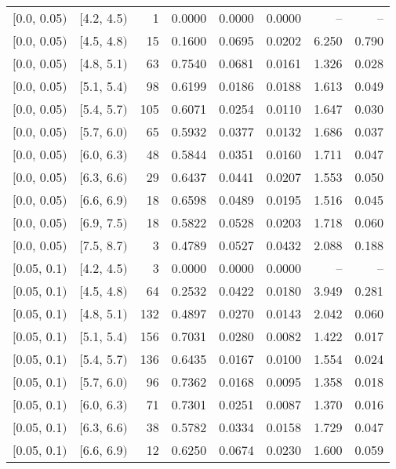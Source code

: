 \begin{longtable}{| l | l | r | r | r | r | r | r |}
        $[$0.0, 0.05$)$ & $[$4.2, 4.5$)$ & 1 & 0.0000 & 0.0000 & 0.0000 & -- & -- \\
        $[$0.0, 0.05$)$ & $[$4.5, 4.8$)$ & 15 & 0.1600 & 0.0695 & 0.0202 & 6.250 & 0.790 \\
        $[$0.0, 0.05$)$ & $[$4.8, 5.1$)$ & 63 & 0.7540 & 0.0681 & 0.0161 & 1.326 & 0.028 \\
        $[$0.0, 0.05$)$ & $[$5.1, 5.4$)$ & 98 & 0.6199 & 0.0186 & 0.0188 & 1.613 & 0.049 \\
        $[$0.0, 0.05$)$ & $[$5.4, 5.7$)$ & 105 & 0.6071 & 0.0254 & 0.0110 & 1.647 & 0.030 \\
        $[$0.0, 0.05$)$ & $[$5.7, 6.0$)$ & 65 & 0.5932 & 0.0377 & 0.0132 & 1.686 & 0.037 \\
        $[$0.0, 0.05$)$ & $[$6.0, 6.3$)$ & 48 & 0.5844 & 0.0351 & 0.0160 & 1.711 & 0.047 \\
        $[$0.0, 0.05$)$ & $[$6.3, 6.6$)$ & 29 & 0.6437 & 0.0441 & 0.0207 & 1.553 & 0.050 \\
        $[$0.0, 0.05$)$ & $[$6.6, 6.9$)$ & 18 & 0.6598 & 0.0489 & 0.0195 & 1.516 & 0.045 \\
        $[$0.0, 0.05$)$ & $[$6.9, 7.5$)$ & 18 & 0.5822 & 0.0528 & 0.0203 & 1.718 & 0.060 \\
        $[$0.0, 0.05$)$ & $[$7.5, 8.7$)$ & 3 & 0.4789 & 0.0527 & 0.0432 & 2.088 & 0.188 \\
        $[$0.05, 0.1$)$ & $[$4.2, 4.5$)$ & 3 & 0.0000 & 0.0000 & 0.0000 & -- & -- \\
        $[$0.05, 0.1$)$ & $[$4.5, 4.8$)$ & 64 & 0.2532 & 0.0422 & 0.0180 & 3.949 & 0.281 \\
        $[$0.05, 0.1$)$ & $[$4.8, 5.1$)$ & 132 & 0.4897 & 0.0270 & 0.0143 & 2.042 & 0.060 \\
        $[$0.05, 0.1$)$ & $[$5.1, 5.4$)$ & 156 & 0.7031 & 0.0280 & 0.0082 & 1.422 & 0.017 \\
        $[$0.05, 0.1$)$ & $[$5.4, 5.7$)$ & 136 & 0.6435 & 0.0167 & 0.0100 & 1.554 & 0.024 \\
        $[$0.05, 0.1$)$ & $[$5.7, 6.0$)$ & 96 & 0.7362 & 0.0168 & 0.0095 & 1.358 & 0.018 \\
        $[$0.05, 0.1$)$ & $[$6.0, 6.3$)$ & 71 & 0.7301 & 0.0251 & 0.0087 & 1.370 & 0.016 \\
        $[$0.05, 0.1$)$ & $[$6.3, 6.6$)$ & 38 & 0.5782 & 0.0334 & 0.0158 & 1.729 & 0.047 \\
        $[$0.05, 0.1$)$ & $[$6.6, 6.9$)$ & 12 & 0.6250 & 0.0674 & 0.0230 & 1.600 & 0.059 \\

\end{longtable}
